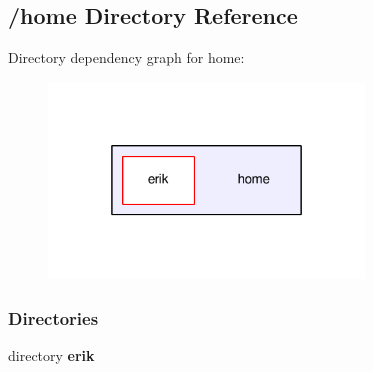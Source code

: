 \subsection{/home Directory Reference}
\label{dir_43e0a1f539e00dcfa1a6bc4d4fee4fc2}
Directory dependency graph for home\+:
\nopagebreak
\begin{figure}[H]
\begin{center}
\leavevmode
\includegraphics[width=238pt]{dir_43e0a1f539e00dcfa1a6bc4d4fee4fc2_dep}
\end{center}
\end{figure}
\subsubsection*{Directories}
\begin{DoxyCompactItemize}
\item 
directory {\bf erik}
\end{DoxyCompactItemize}
